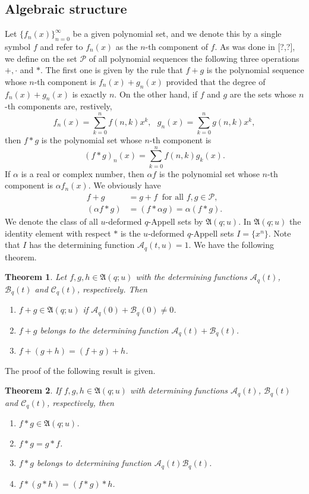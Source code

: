 \documentclass[12pt]{article}
\newcommand{\A}{\mathcal{A}}
\newtheorem{theorem}{Theorem}
\begin{document}
\subsection{Algebraic structure}

Let $\{f_{n}(x)\}_{n=0}^{\infty}$ be a given polynomial set, and we denote this by a single symbol $f$ and refer to $f_{n}(x)$ as the $n$-th component of $f$. As was done in [?,?], we define on the set $\mathcal{P}$ of all polynomial sequences the following three operations $+,\cdot$ and $*$. The first one is given by the rule that $f+g$ is the polynomial sequence whose $n$-th component is $f_{n}(x)+g_{n}(x)$ provided that the degree of $f_{n}(x)+g_{n}(x)$ is exactly $n$. On the other hand, if $f$ and $g$ are the sets whose $n$-th components are, restively,
\begin{equation*}
    f_{n}(x)=\sum_{k=0}^{n}f(n,k)x^{k},\ \ \ g_{n}(x)=\sum_{k=0}^{n}g(n,k)x^k,
\end{equation*}
then $f*g$ is the polynomial set whose $n$-th component is
\begin{equation*}
    (f*g)_{n}(x)=\sum_{k=0}^{n}f(n,k)g_{k}(x).
\end{equation*}
If $\alpha$ is a real or complex number, then $\alpha f$ is the polynomial set whose $n$-th component is $\alpha f_{n}(x)$. We obviously have
\begin{align*}
    f+g&=g+f\ \text{ for all }f,g\in\mathcal{P},\\
    (\alpha f*g)&=(f*\alpha g)=\alpha(f*g).
\end{align*}
We denote the class of all $u$-deformed $q$-Appell sets by $\mathfrak{A}(q;u)$. In $\mathfrak{A}(q;u)$ the identity element with respect $*$ is the $u$-deformed $q$-Appell sets $I=\{x^n\}$. Note that $I$ has the determining function $\A_{q}(t,u)=1$. We have the following theorem.
\begin{theorem}
Let $f,g,h\in\mathfrak{A}(q;u)$ with the determining functions $\A_{q}(t)$, $\mathcal{B}_{q}(t)$ and $\mathcal{C}_{q}(t)$, respectively. Then 
\begin{enumerate}
    \item $f+g\in\mathfrak{A}(q;u)$ if $\A_{q}(0)+\mathcal{B}_{q}(0)\neq0$.
    \item $f+g$ belongs to the determining function $\A_{q}(t)+\mathcal{B}_{q}(t)$.
    \item $f+(g+h)=(f+g)+h$. 
\end{enumerate}
\end{theorem}
The proof of the following result is given.
\begin{theorem}\label{theo_prod_qappel}
If $f,g,h\in\mathfrak{A}(q;u)$ with determining functions $\A_{q}(t)$, $\mathcal{B}_{q}(t)$ and $\mathcal{C}_{q}(t)$, respectively, then 
\begin{enumerate}
    \item $f*g\in\mathfrak{A}(q;u)$.
    \item $f*g=g*f$.
    \item $f*g$ belongs to determining function $\A_{q}(t)\mathcal{B}_{q}(t)$.
    \item $f*(g*h)=(f*g)*h$.
\end{enumerate}
\end{theorem}
\end{document}
